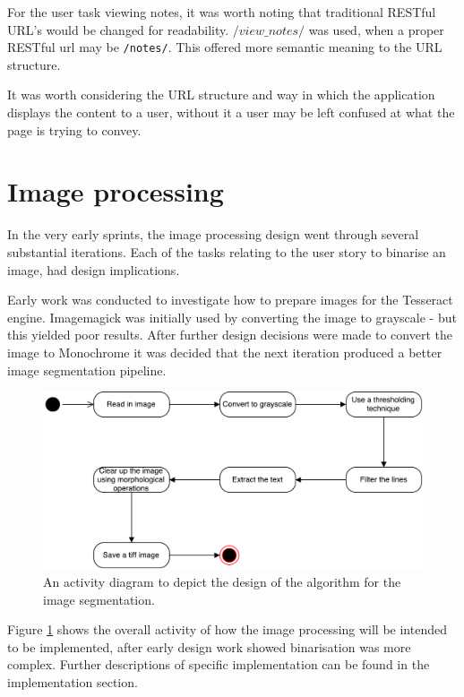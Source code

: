 For the user task viewing notes, it was worth noting that traditional RESTful URL's would be changed for readability. \texttt{$/view\_notes/$} was used, when a proper RESTful url may be \texttt{/notes/}. This offered more semantic meaning to the URL structure.

It was worth considering the URL structure and way in which the application displays the content to a user, without it a user may be left confused at what the page is trying to convey.

\section{Image processing}
In the very early sprints, the image processing design went through several substantial iterations. Each of the tasks relating to the user story to binarise an image, had design implications.

Early work was conducted to investigate how to prepare images for the Tesseract engine. Imagemagick was initially used by converting the image to grayscale - but this yielded poor results. After further design decisions were made to convert the image to Monochrome it was decided that the next iteration produced a better image segmentation pipeline.

\begin{figure}[H]
  \centering
  \includegraphics[scale=0.2]{images/image_binarisation_activity.pdf}
  \caption{An activity diagram to depict the design of the algorithm for the image segmentation.}
  \label{fig:activity_binarise}
\end{figure}

Figure \ref{fig:activity_binarise} shows the overall activity of how the image processing will be intended to be implemented, after early design work showed binarisation was more complex. Further descriptions of specific implementation can be found in the implementation section.

